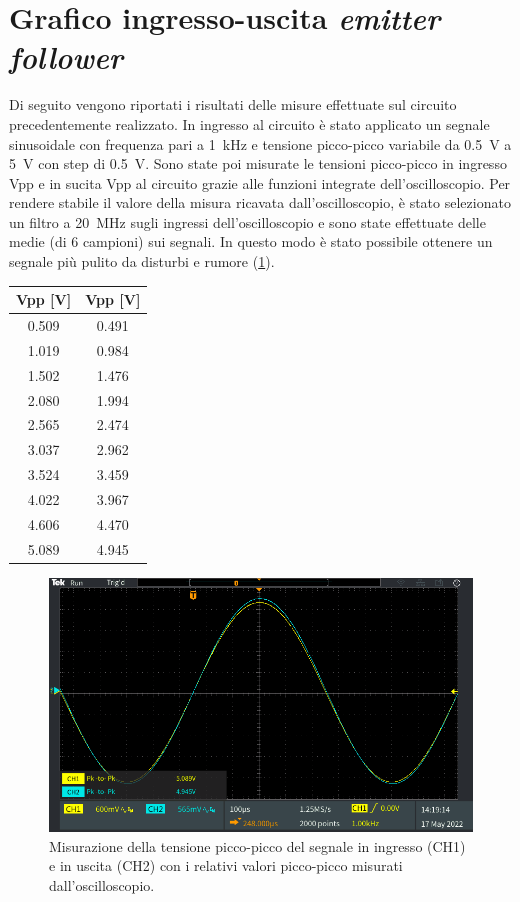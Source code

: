 \section{Grafico ingresso-uscita \textit{emitter follower}}
Di seguito vengono riportati i risultati delle misure effettuate sul circuito precedentemente realizzato. In ingresso al circuito è stato applicato un segnale sinusoidale con frequenza pari a \SI{1}{\kilo\hertz} e tensione picco-picco variabile da \SI{0.5}{\volt} a \SI{5}{\volt} con step di \SI{0.5}{\volt}. Sono state poi misurate le tensioni picco-picco in ingresso Vpp e in sucita Vpp al circuito grazie alle funzioni integrate dell'oscilloscopio. Per rendere stabile il valore della misura ricavata dall'oscilloscopio, è stato selezionato un filtro a \SI{20}{\mega\hertz} sugli ingressi dell'oscilloscopio e sono state effettuate delle medie (di 6
 campioni) sui segnali. In questo modo è stato possibile ottenere un segnale più pulito da disturbi e rumore (\Fig\ref{fig:emitterfollwer_misurepiccopicco}).
\begin{table}[h!]
	\centering
	\begin{tabular}{c|c}
		\hline
		Vpp\sub{i} [V] & Vpp\sub{o} [V]\\ \hline
		0.509 & 0.491 \\ \hline
		1.019 & 0.984 \\ \hline
		1.502 & 1.476 \\ \hline
		2.080 & 1.994 \\ \hline
		2.565 & 2.474 \\ \hline
		3.037 & 2.962 \\ \hline
		3.524 & 3.459 \\ \hline
		4.022 & 3.967 \\ \hline
		4.606 & 4.470 \\ \hline
		5.089 & 4.945 \\ \hline
	\end{tabular}
\end{table}
\begin{figure}[h!]
	\centering
	\includegraphics[width=0.7\linewidth]{./ImageFiles/Laboratorio 2/TEK00012}
	\caption{Misurazione della tensione picco-picco del segnale in ingresso (CH1) e in uscita (CH2) con i relativi valori picco-picco misurati dall'oscilloscopio.}
	\label{fig:emitterfollwer_misurepiccopicco}
\end{figure}

